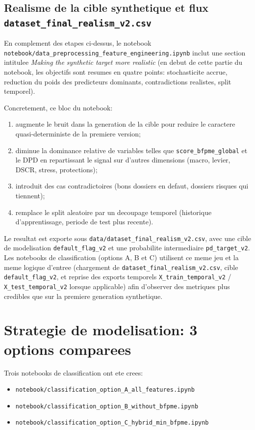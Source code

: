 \documentclass[11pt,a4paper]{article}
\begin{document}
\subsection{Realisme de la cible synthetique et flux \texttt{dataset\_final\_realism\_v2.csv}}

En complement des etapes ci-dessus, le notebook \texttt{notebook/data\_preprocessing\_feature\_engineering.ipynb} inclut une section intitulee \emph{Making the synthetic target more realistic} (en debut de cette partie du notebook, les objectifs sont resumes en quatre points: stochasticite accrue, reduction du poids des predicteurs dominants, contradictions realistes, split temporel).

Concretement, ce bloc du notebook:
\begin{enumerate}[leftmargin=1.2cm, label=\arabic*., widest=4]
  \item augmente le bruit dans la generation de la cible pour reduire le caractere quasi-deterministe de la premiere version;
  \item diminue la dominance relative de variables telles que \texttt{score\_bfpme\_global} et le DPD en repartissant le signal sur d'autres dimensions (macro, levier, DSCR, stress, protections);
  \item introduit des cas contradictoires (bons dossiers en defaut, dossiers risques qui tiennent);
  \item remplace le split aleatoire par un decoupage temporel (historique d'apprentissage, periode de test plus recente).
\end{enumerate}

Le resultat est exporte sous \texttt{data/dataset\_final\_realism\_v2.csv}, avec une cible de modelisation \texttt{default\_flag\_v2} et une probabilite intermediaire \texttt{pd\_target\_v2}. Les notebooks de classification (options A, B et C) utilisent ce meme jeu et la meme logique d'entree (chargement de \texttt{dataset\_final\_realism\_v2.csv}, cible \texttt{default\_flag\_v2}, et reprise des exports temporels \texttt{X\_train\_temporal\_v2} / \texttt{X\_test\_temporal\_v2} lorsque applicable) afin d'observer des metriques plus credibles que sur la premiere generation synthetique.

\section{Strategie de modelisation: 3 options comparees}

Trois notebooks de classification ont ete crees:
\begin{itemize}[leftmargin=1.2cm]
  \item \texttt{notebook/classification\_option\_A\_all\_features.ipynb}
  \item \texttt{notebook/classification\_option\_B\_without\_bfpme.ipynb}
  \item \texttt{notebook/classification\_option\_C\_hybrid\_min\_bfpme.ipynb}
\end{itemize}
\end{document}
